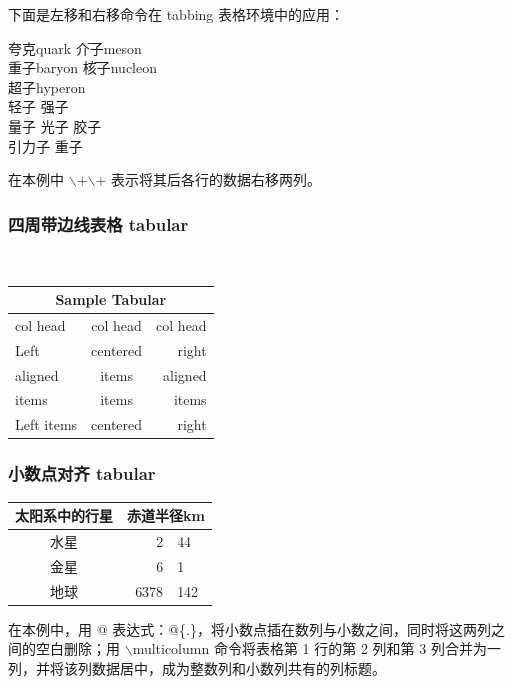 \documentclass[presentation]{beamer}
\begin{document}
\begin{frame}[allowframebreaks]
下面是左移和右移命令在 tabbing 表格环境中的应用：
\begin{tabbing}
夸克quark \hspace{5mm}\= 介子meson\\
\> 重子baryon \hspace{5mm}\= 核子nucleon \+\+\\
超子hyperon \-\\
轻子 \> 强子 \\
\< 量子 \> 光子 \> 胶子\\
引力子 \> 重子 \\
\end{tabbing}

在本例中 $\backslash$+$\backslash$+ 表示将其后各行的数据右移两列。
\end{frame}


\begin{frame}
  \frametitle{四周带边线表格 tabular}%
\
\begin{tabular}{|l|c|r|}\hline
\multicolumn{3}{|c|}{Sample Tabular}\\\hline
col head & col head & col head\\\hline
Left & centered & right\\\cline{1-2}
aligned & items & aligned\\\cline{2-3}
items & items & items\\\cline{1-2}
Left items & centered & right\\\hline
\end{tabular}
\end{frame}


\begin{frame}
  \frametitle{小数点对齐 tabular}%
  \begin{tabular}{c r @{.} l}\hline
    太阳系中的行星 & \multicolumn{2}{c}{赤道半径km}\\\hline
    水星 & 2 & 44\\
    金星 & 6 & 1\\
    地球 & 6378 & 142\\\hline
  \end{tabular}

在本例中，用 @ 表达式：@\{.\}，将小数点插在数列与小数之间，同时将这两列之间的空白删除；用 $\backslash$multicolumn 命令将表格第 1 行的第 2 列和第 3 列合并为一列，并将该列数据居中，成为整数列和小数列共有的列标题。
\end{frame}


\begin{frame}
  \frametitle{}%

\end{frame}
\end{document}
